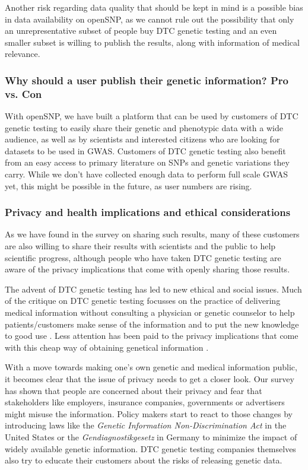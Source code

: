 \documentclass[10pt]{article}
\begin{document}
Another risk regarding data quality that should be kept in mind is a possible bias in data availability on openSNP, as we cannot rule out the possibility that only an unrepresentative subset of people buy DTC genetic testing and an even smaller subset is willing to publish the results, along with information of medical relevance.
\subsubsection*{Why should a user publish their genetic information? Pro vs. Con}
With openSNP, we have built a platform that can be used by customers of DTC genetic testing to easily share their genetic and phenotypic data with a wide audience, as well as by scientists and interested citizens who are looking for datasets to be used in GWAS. Customers of DTC genetic testing also benefit from an easy access to primary literature on SNPs and genetic variations they carry. While we don't have collected enough data to perform full scale GWAS yet, this might be possible in the future, as user numbers are rising. 
\subsubsection*{Privacy and health implications and ethical considerations}

As we have found in the survey on sharing such results, many of these customers are also willing to share their results with scientists and the public to help scientific progress, although people who have taken DTC genetic testing are aware of the privacy implications that come with openly sharing those results.      

The advent of DTC genetic testing has led to new ethical and social issues. Much of the critique on DTC genetic testing focusses on the practice of delivering medical information without consulting a physician or genetic counselor to help patients/customers make sense of the information and to put the new knowledge to good use \cite{Hauskeller2011,Hogarth2008,Wasson2009}. Less attention has been paid to the privacy implications that come with this cheap way of obtaining genetical information \cite{Caulfield2011,Joh2011}. 

With a move towards making one's own genetic and medical information public, it becomes clear that the issue of privacy needs to get a closer look. Our survey has shown that people are concerned about their privacy and fear that stakeholders like employers, insurance companies, governments or advertisers might misuse the information. Policy makers start to react to those changes by introducing laws like the \textit{Genetic Information Non-Discrimination Act} in the United States or the \emph{Gendiagnostikgesetz} in Germany to minimize the impact of widely available genetic information. DTC genetic testing companies themselves also try to educate their customers about the risks of releasing genetic data.  
\end{document}
